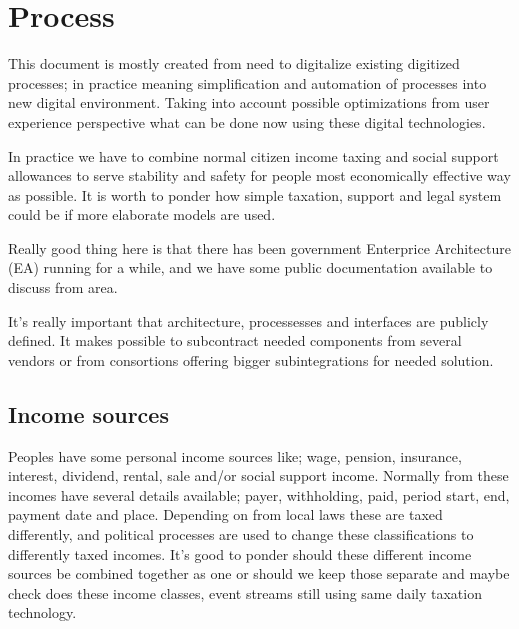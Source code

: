 %
%
%
\chapter{Process}
\label{process}
This document is mostly created from need to digitalize existing digitized
processes; in practice meaning simplification and automation of processes into
new digital environment. Taking into account possible optimizations from user
experience perspective what can be done now using these digital technologies.

In practice we have to combine normal citizen income taxing and social support
allowances to serve stability and safety for people most economically
effective way as possible. It is worth to ponder how simple taxation, support
and legal system could be if more elaborate models are used. 

Really good thing here is that there has been government Enterprice
Architecture (EA) running for a while, and we have some public documentation
available to discuss from area.

It's really important that architecture, processesses and interfaces are
publicly defined. It makes possible to subcontract needed components from
several vendors or from consortions offering bigger subintegrations for needed
solution.


\section{Income sources}
\label{income_sources}
Peoples have some personal income sources like; wage, pension, insurance,
interest, dividend, rental, sale and/or social support income. Normally from
these incomes have several details available; payer, withholding, paid, period
start, end, payment date and place. Depending on from local laws these are
taxed differently, and political processes are used to change these
classifications to differently taxed incomes. It's good to ponder should these
different income sources be combined together as one or should we keep those
separate and maybe check does these income classes, event streams still using
same daily taxation technology.

